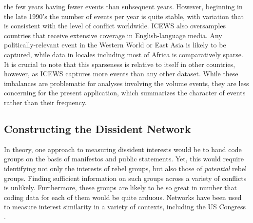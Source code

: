 the few years having fewer events than subsequent years. However, beginning in the late 1990's the number of events per year is quite stable, with variation that is consistent with the level of conflict worldwide. ICEWS also oversamples countries that receive extensive coverage in English-language media. Any politically-relevant event in the Western World or East Asia is likely to be captured, while data in locales including most of Africa is comparatively sparse. It is crucial to note that this sparseness is relative to itself in other countries, however, as ICEWS captures more events than any other dataset. While these imbalances are problematic for analyses involving the volume events, they are less concerning for the present application, which summarizes the character of events rather than their frequency.

\subsection{Constructing the Dissident Network}

In theory, one approach to measuring dissident interests would be to hand code groups on the basis of manifestos and public statements. Yet, this would require identifying not only the interests of rebel groups, but also those of \textit{potential} rebel groups. Finding sufficient information on such groups across a variety of conflicts is unlikely. Furthermore, these groups are likely to be so great in number that coding data for each of them would be quite arduous. Networks have been used to measure interest similarity in a variety of contexts, including the US Congress \citep{Andris2015}.

